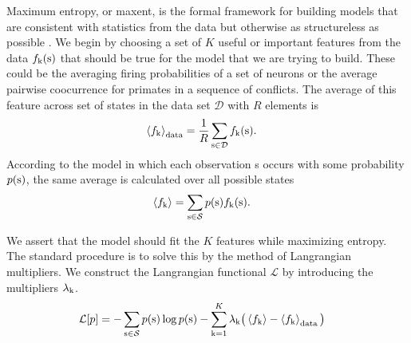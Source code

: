 \documentclass[aps,prl,twocolumn,nofootinbib]{revtex4-1}
\begin{document}
Maximum entropy, or maxent, is the formal framework for building models that are consistent with statistics from the data but otherwise as structureless as possible \cite{Bretthorst:2003ua,Jaynes:1957fy}.
We begin by choosing a set of $K$ useful or important features from the data $f_{\rm k}({\rm s})$ that should be true for the model that we are trying to build. These could be the averaging firing probabilities of a set of neurons or the average pairwise coocurrence for primates in a sequence of conflicts. The average of this feature across set of states in the data set $\mathcal{D}$ with $R$ elements is
\begin{align}
	\left<f_{\rm k}\right>_{\rm data} &= \frac{1}{R}\sum_{{\rm s}\in \mathcal{D}} f_{\rm k}({\rm s}).
\end{align}
According to the model in which each observation s occurs with some probability $p(\rm s)$, the same average is calculated over all possible states
\begin{align}
	\left<f_{\rm k}\right> &= \sum_{\rm s\in\mathcal{S}} p({\rm s})f_{\rm k}({\rm s}).
\end{align}

We assert that the model should fit the $K$ features while maximizing entropy. The standard procedure is to solve this by the method of Langrangian multipliers. We construct the Langrangian functional $\mathcal{L}$ by introducing the multipliers $\lambda_{\rm k}$.
\begin{align}
	\mathcal{L}[p] &= -\sum_{\rm s\in\mathcal{S}} p({\rm s})\log p({\rm s}) - \sum_{\rm k=1}^{K} \lambda_{\rm k} \big(\left<f_{\rm k}\right>-\left<f_{\rm k}\right>_{\rm data}\big)\label{eq:Lagrang}
\end{align}


\end{document}
